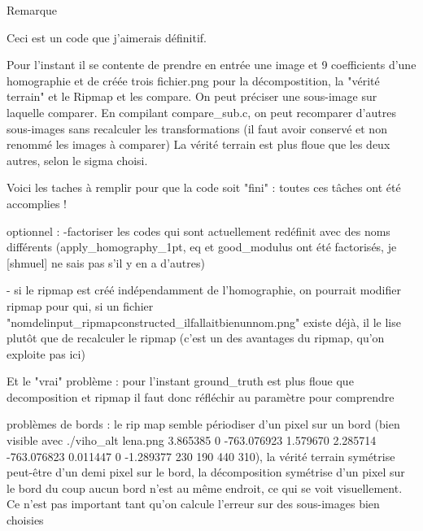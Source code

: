 Remarque

Ceci est un code que j’aimerais définitif.

Pour l'instant il se contente de prendre en entrée une image et 9 coefficients d'une homographie et de créée trois fichier.png pour la décompostition, la "vérité terrain" et le Ripmap et les compare. On peut préciser une sous-image sur laquelle comparer.
En compilant compare_sub.c, on peut recomparer d'autres sous-images sans recalculer les transformations (il faut avoir conservé et non renommé les images à comparer)
La vérité terrain est plus floue que les deux autres, selon le sigma choisi.



Voici les taches à remplir pour que la code soit "fini" :
	toutes ces tâches ont été accomplies !
	
	
	
optionnel :
	-factoriser les codes qui sont actuellement redéfinit avec des noms différents (apply_homography_1pt, eq et good_modulus ont été factorisés, je [shmuel] ne sais pas s'il y en a d'autres)
	
	- si le ripmap est créé indépendamment de l'homographie, on pourrait modifier ripmap pour qui, si un fichier "nomdelinput_ripmapconstructed_ilfallaitbienunnom.png" existe déjà, il le lise plutôt que de recalculer le ripmap (c'est un des avantages du ripmap, qu'on exploite pas ici)
	
	
	
Et le "vrai" problème :
	pour l'instant ground_truth est plus floue que decomposition et ripmap
	il faut donc réfléchir au paramètre pour comprendre

problèmes de bords :
	le rip map semble périodiser d'un pixel sur un bord (bien visible avec ./viho_alt lena.png 3.865385 0 -763.076923 1.579670 2.285714 -763.076823 0.011447 0 -1.289377 230 190 440 310), la vérité terrain symétrise peut-être d'un demi pixel sur le bord, la décomposition symétrise d'un pixel sur le bord
	du coup aucun bord n'est au même endroit, ce qui se voit visuellement. Ce n'est pas important tant qu'on calcule l'erreur sur des sous-images bien choisies
